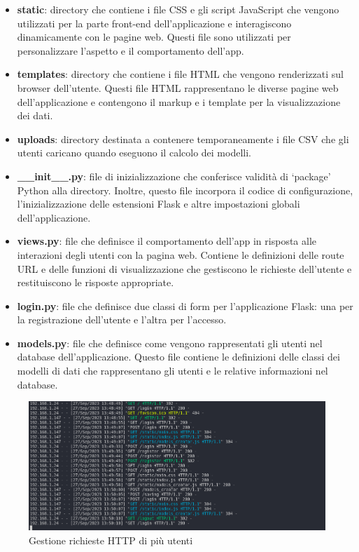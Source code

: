 \documentclass{rapportECL}
\begin{document}
\begin{itemize}
  \item \textbf{static}: directory che contiene i file CSS e gli script JavaScript che vengono utilizzati per la parte front-end dell'applicazione 
  e interagiscono dinamicamente con le pagine web. Questi file sono utilizzati per personalizzare l'aspetto e il comportamento dell'app.
  \item \textbf{templates}: directory che contiene  i file HTML che vengono renderizzati sul browser dell'utente. Questi file HTML rappresentano 
  le diverse pagine web dell'applicazione e contengono il markup e i template per la visualizzazione dei dati.
  \item \textbf{uploads}: directory destinata a contenere temporaneamente i file CSV che gli utenti caricano quando eseguono il calcolo dei modelli. 
  \item \textbf{\_\_init\_\_.py}: file di inizializzazione che conferisce validità di `package' Python alla directory. 
  Inoltre, questo file incorpora il codice di configurazione, l'inizializzazione delle estensioni Flask e altre impostazioni globali dell'applicazione.
  \item \textbf{views.py}: file che definisce il comportamento dell'app in risposta alle interazioni degli utenti con la pagina web. Contiene le definizioni 
  delle route URL e delle funzioni di visualizzazione che gestiscono le richieste dell'utente e restituiscono le risposte appropriate.
  \item \textbf{login.py}: file che definisce due classi di form per l'applicazione Flask: una per la registrazione dell'utente e l'altra per l'accesso.
  \item \textbf{models.py}: file che definisce come vengono rappresentati gli utenti nel database dell'applicazione. Questo file contiene le definizioni 
  delle classi dei modelli di dati che rappresentano gli utenti e le relative informazioni nel database.
\end{itemize}

\begin{figure}[htp]
  \centering
  \includegraphics[width=1\textwidth]{images/img7.png}
  \caption{Gestione richieste HTTP di più utenti}
\end{figure}
\end{document}
